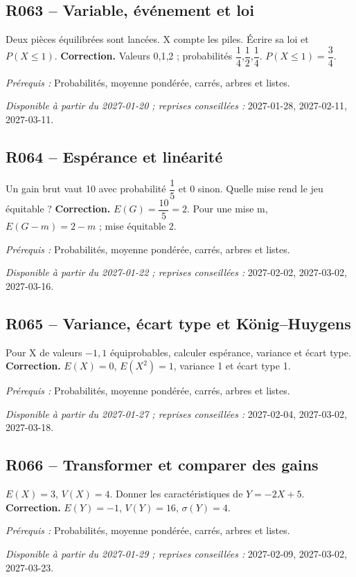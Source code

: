 \subsection*{R063 -- Variable, événement et loi}\label{R063}
Deux pièces équilibrées sont lancées. X compte les piles. Écrire sa loi et $P(X\leq1)$.
\ifmxteacher\textbf{Correction.} Valeurs 0,1,2 ; probabilités $\dfrac{1}{4}$,$\dfrac{1}{2}$,$\dfrac{1}{4}$. $P(X\leq1)=\dfrac{3}{4}$.\par\textit{Prérequis :} Probabilités, moyenne pondérée, carrés, arbres et listes.\par\textit{Disponible à partir du 2027-01-20 ; reprises conseillées :} 2027-01-28, 2027-02-11, 2027-03-11.\fi
{}\subsection*{R064 -- Espérance et linéarité}\label{R064}
Un gain brut vaut 10 avec probabilité $\dfrac{1}{5}$ et 0 sinon. Quelle mise rend le jeu équitable ?
\ifmxteacher\textbf{Correction.} $E(G)=\dfrac{10}{5}=2$. Pour une mise m, $E(G-m)=2-m$ ; mise équitable 2.\par\textit{Prérequis :} Probabilités, moyenne pondérée, carrés, arbres et listes.\par\textit{Disponible à partir du 2027-01-22 ; reprises conseillées :} 2027-02-02, 2027-03-02, 2027-03-16.\fi
{}\subsection*{R065 -- Variance, écart type et König–Huygens}\label{R065}
Pour X de valeurs $-1,1$ équiprobables, calculer espérance, variance et écart type.
\ifmxteacher\textbf{Correction.} $E(X)=0$, $E(X^2)=1$, variance 1 et écart type 1.\par\textit{Prérequis :} Probabilités, moyenne pondérée, carrés, arbres et listes.\par\textit{Disponible à partir du 2027-01-27 ; reprises conseillées :} 2027-02-04, 2027-03-02, 2027-03-18.\fi
{}\subsection*{R066 -- Transformer et comparer des gains}\label{R066}
$E(X)=3$, $V(X)=4$. Donner les caractéristiques de $Y=-2X+5$.
\ifmxteacher\textbf{Correction.} $E(Y)=-1$, $V(Y)=16$, $\sigma(Y)=4$.\par\textit{Prérequis :} Probabilités, moyenne pondérée, carrés, arbres et listes.\par\textit{Disponible à partir du 2027-01-29 ; reprises conseillées :} 2027-02-09, 2027-03-02, 2027-03-23.\fi
